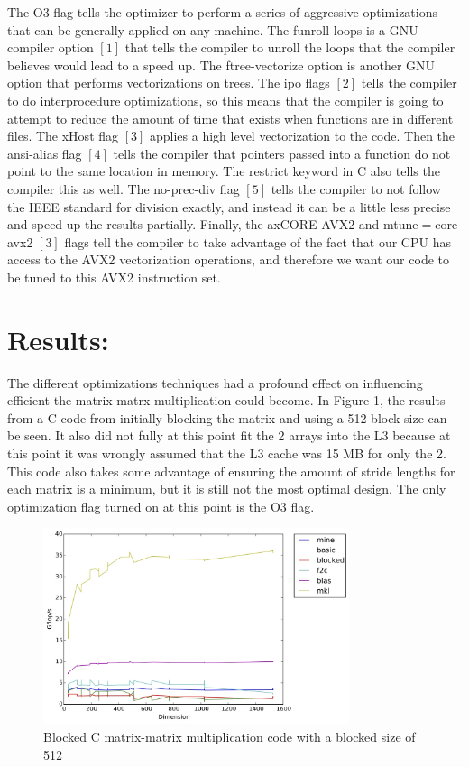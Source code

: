 \documentclass{article}
\begin{document}
The O3 flag tells the optimizer to perform a series of aggressive optimizations that can be generally applied on any machine. The funroll-loops is a GNU compiler option $[1]$ that tells the compiler to unroll the loops that the compiler believes would lead to a speed up. The ftree-vectorize option is another GNU option that performs vectorizations on trees. The ipo flags $[2]$ tells the compiler to do interprocedure optimizations, so this means that the compiler is going to attempt to reduce the amount of time that exists when functions are in different files. The xHost flag $[3]$ applies a high level vectorization to the code. Then the ansi-alias flag $[4]$ tells the compiler that pointers passed into a function do not point to the same location in memory. The restrict keyword in C also tells the compiler this as well. The no-prec-div flag $[5]$ tells the compiler to not follow the IEEE standard for division exactly, and instead it can be a little less precise and speed up the results partially. Finally, the axCORE-AVX2  and mtune$=$core-avx2 $[3]$ flags tell the compiler to take advantage of the fact that our CPU has access to the AVX2 vectorization operations, and therefore we want our code to be tuned to this AVX2 instruction set. 

\section*{Results:}

The different optimizations techniques had a profound effect on influencing efficient the matrix-matrx multiplication could become. In Figure 1, the results from a C code from initially blocking the matrix and using a 512 block size  can be seen. It also did not fully at this point fit the 2 arrays into the L3 because at this point it was wrongly assumed that the L3 cache was 15 MB for only the 2. This code also takes some advantage of ensuring the amount of stride lengths for each matrix is a minimum, but it is still not the most optimal design. The only optimization flag turned on at this point is the O3 flag.

\begin{figure}[H]
  \centering
    \includegraphics[width=0.8\textwidth]{cblocked_no_opt_flags}
    \caption{Blocked C matrix-matrix multiplication code with a blocked size of 512}
\end{figure}
\end{document}

